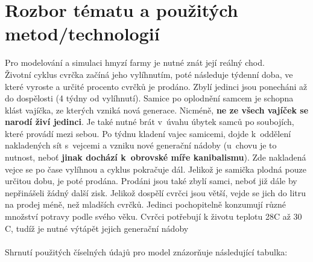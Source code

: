 \documentclass[11pt, a4paper, titlepage]{article}
\begin{document}
    \section{Rozbor tématu a použitých metod/technologií}
    Pro modelování a simulaci hmyzí farmy je nutné znát její reálný chod. \\
    Životní cyklus cvrčka začíná jeho vylíhnutím, poté následuje týdenní doba, ve které vyroste a určité procento cvrčků je prodáno.
    Zbylí jedinci jsou ponecháni až do dospělosti (4 týdny od vylíhnutí).
    Samice po oplodnění samcem je schopna klást vajíčka, ze kterých vzniká nová generace.
    Nicméně, \textbf{ne ze všech vajíček se narodí živí jedinci}. Je také nutné brát v~úvahu úbytek samců po soubojích, které provádí mezi sebou.
    Po týdnu kladení vajec samicemi, dojde k~oddělení nakladených sít s~vejcemi a vzniku nové generační nádoby (u~chovu je to nutnost, neboť \textbf{jinak dochází
    k~obrovské míře kanibalismu}). Zde nakladená vejce se po čase vylíhnou a cyklus pokračuje dál. Jelikož je samička plodná pouze určitou dobu,
    je poté prodána. Prodáni jsou také zbylí samci, neboť již dále by nepřinášeli žádný další zisk. Jelikož dospělí cvrčci jsou větší,
    vejde se jich do litru na prodej méně, než mladších cvrčků. Jedinci pochopitelně konzumují různé množství potravy podle svého věku. Cvrčci potřebují k
    životu teplotu 28\degree C až 30 \degree C, tudíž je nutné výtápět jejich generační nádoby\\
    \\
    Shrnutí použitých číselných údajů pro model znázorňuje následující tabulka:
\end{document}
